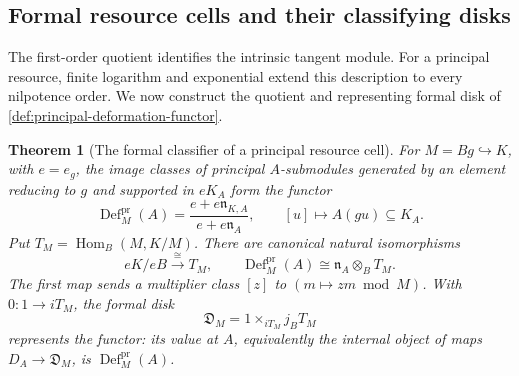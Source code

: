 \documentclass[11pt,a4paper]{article}
\numberwithin{algorithm}{section}
\numberwithin{equation}{section}
\newtheorem{theorem}{Theorem}[section]
\theoremstyle{definition}
\theoremstyle{remark}
\theoremstyle{plain}
\newcommand{\incl}{\hookrightarrow}
\newcommand{\Hom}{\operatorname{Hom}}
\theoremstyle{definition}
\theoremstyle{plain}
\begin{document}
\subsection{Formal resource cells and their classifying disks}
\label{sec:formal-resource-moduli}
The first-order quotient identifies the intrinsic tangent module.
For a principal resource, finite logarithm and exponential extend
this description to every nilpotence order. We now construct
the quotient and representing formal disk of
\cref{def:principal-deformation-functor}.

\begin{theorem}[The formal classifier of a principal resource cell]
\label{thm:principal-formal-deformations}
\label{thm:linearized-deformations}
For $M=Bg\incl K$, with $e=e_g$, the image classes of principal
$A$-submodules generated by an element reducing to $g$ and supported
in $eK_A$ form the functor
\begin{equation}\label{eq:formal-resource-functor}
 \operatorname{Def}^{\mathrm{pr}}_M(A)
 =\frac{e+e\mathfrak n_{K,A}}{e+e\mathfrak n_A},
 \qquad [u]\longmapsto A(gu)\subseteq K_A.
\end{equation}
Put $T_M=\Hom_B(M,K/M)$. There are canonical natural isomorphisms
\begin{equation}\label{eq:linearized-deformations}
 eK/eB\xrightarrow{\ \cong\ }T_M,\qquad
 \operatorname{Def}^{\mathrm{pr}}_M(A)
       \cong\mathfrak n_A\otimes_BT_M.
\end{equation}
The first map sends a multiplier class $[z]$ to
$(m\mapsto zm\bmod M)$. With $0:1\to iT_M$, the formal disk
\begin{equation}\label{eq:resource-formal-disk}
 \mathfrak D_M=1\times_{iT_M}j_BT_M
\end{equation}
represents the functor: its value at $A$, equivalently the internal
object of maps $D_A\to\mathfrak D_M$, is
$\operatorname{Def}^{\mathrm{pr}}_M(A)$.
\end{theorem}
\end{document}
